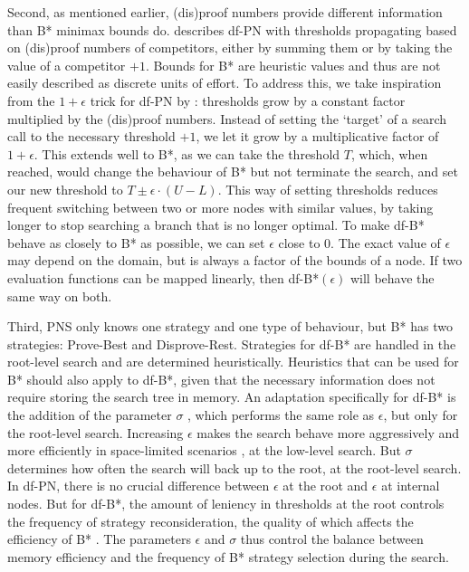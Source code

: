 Second, as mentioned earlier, (dis)proof numbers provide different information than B* minimax bounds do.  describes df-PN with thresholds propagating based on (dis)proof numbers of competitors, either by summing them or by taking the value of a competitor $+1$. 
Bounds for B* are heuristic values and thus are not easily described as discrete units of effort. To address this, we take inspiration from the $1+\epsilon$ trick for df-PN by : thresholds grow by a constant factor multiplied by the (dis)proof numbers. Instead of setting the `target' of a search call to the necessary threshold $+1$, we let it grow by a multiplicative factor of $1+\epsilon$. This extends well to B*, as we can take the threshold $T$, which, when reached, would change the behaviour of B* but not terminate the search, and set our new threshold to $T \pm \epsilon\cdot\left(U-L\right)$.
This way of setting thresholds reduces frequent switching between two or more nodes with similar values, by taking longer to stop searching a branch that is no longer optimal.
To make df-B* behave as closely to B* as possible, we can set $\epsilon$ close to $0$. The exact value of $\epsilon$ may depend on the domain, but is always a factor of the bounds of a node. If two evaluation functions can be mapped linearly, then df-B*$\left(\epsilon\right)$ will behave the same way on both.

Third, PNS only knows one strategy and one type of behaviour, but B* has two strategies: Prove-Best and Disprove-Rest. Strategies for df-B* are handled in the root-level search and are determined heuristically. Heuristics that can be used for B* should also apply to df-B*, given that the necessary information does not require storing the search tree in memory. An adaptation specifically for df-B* is the addition of the parameter $\sigma$ , which performs the same role as $\epsilon$, but only for the root-level search. Increasing $\epsilon$ makes the search behave more aggressively and more efficiently in space-limited scenarios \cite{PawlewiczLew2007}, at the low-level search. But $\sigma$ determines how often the search will back up to the root, at the root-level search. In df-PN, there is no crucial difference between $\epsilon$ at the root and $\epsilon$ at internal nodes. But for df-B*, the amount of leniency in thresholds at the root controls the frequency of strategy reconsideration, the quality of which affects the efficiency of B* \cite{Berliner1979}. The parameters $\epsilon$ and $\sigma$ thus control the balance between memory efficiency and the frequency of B* strategy selection during the search.

